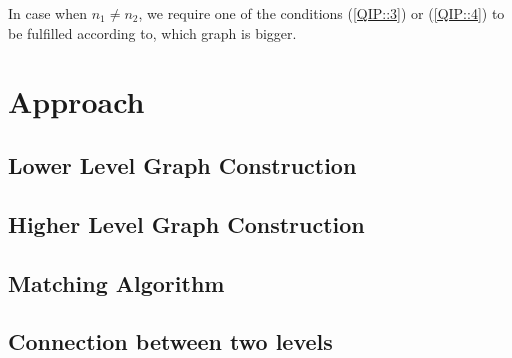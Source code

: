 \documentclass[
	fontsize=12pt,
	paper=a4,
	twoside=false,
	numbers=noenddot,
	plainheadsepline,
	toc=listof,
	toc=bibliography
]{scrartcl}
\begin{document}
In case when $n_1\not = n_2$, we require one of the conditions (\ref{QIP::3}) or (\ref{QIP::4}) to be fulfilled according to, which graph is bigger.



 
 



\section{Approach}



\subsection{Lower Level Graph Construction}


\subsection{Higher Level Graph Construction}


\subsection{Matching Algorithm}


\subsection{Connection between two levels}


%

	
\end{document}
